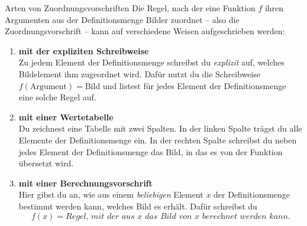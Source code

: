 \documentclass[../../main.tex]{subfiles}
\begin{document}
\begin{nutshell}{Arten von Zuordnungsvorschriften}
    Die Regel, nach der eine Funktion $f$ ihren Argumenten aus der Definitionsmenge Bilder zuordnet -- also die Zuordnungsvorschrift -- kann auf verschiedene Weisen aufgeschrieben werden:
    \begin{enumerate}
        \item \textbf{mit der expliziten Schreibweise}\\
            \sloppy
            Zu jedem Element der Definitionsmenge schreibst du \emph{explizit} auf, welches Bildelement ihm zugeordnet wird. Dafür nutzt du die Schreibweise \mbox{$f(\text{Argument})=\text{Bild}$} und listest für jedes Element der Definitionsmenge eine solche Regel auf.
        
            \fussy
        \item \textbf{mit einer Wertetabelle}\\
            Du zeichnest eine Tabelle mit zwei Spalten. In der linken Spalte trägst du alle Elemente der Definitionsmenge ein. In der rechten Spalte schreibst du neben jedes Element der Definitionsmenge das Bild, in das es von der Funktion übersetzt wird.
        
        \item \textbf{mit einer Berechnungsvorschrift}\\
            Hier gibst du an, wie aus einem \emph{beliebigen} Element $x$ der Definitionsmenge bestimmt werden kann, welches Bild es erhält. Dafür schreibst du
            \[f(x)=\textit{Regel, mit der aus $x$ das Bild von $x$ berechnet werden kann}.\]
    \end{enumerate}
\end{nutshell}
\end{document}
